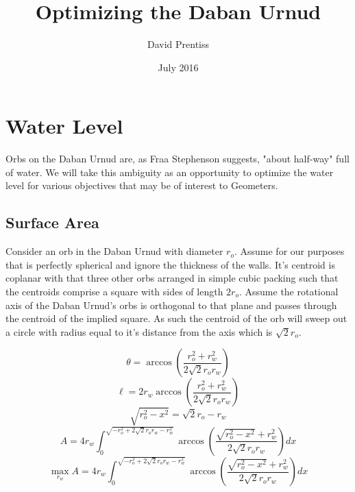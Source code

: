 \documentclass{amsart}
\title{Optimizing the Daban Urnud}
\author{David Prentiss}
\date{July 2016}
\begin{document}
\maketitle

\section{Water Level}

Orbs on the Daban Urnud are, as Fraa Stephenson suggests, "about half-way" full of water.
We will take this ambiguity as an opportunity to optimize the water level for various objectives that may be of interest to Geometers. 

\subsection{Surface Area}

Consider an orb in the Daban Urnud with diameter $r_o$.
Assume for our purposes that is perfectly spherical and ignore the thickness of the walls.
It's centroid is coplanar with that three other orbs arranged in simple cubic packing such that the centroids comprise a square with sides of length $2r_o$. 
Assume the rotational axis of the Daban Urnud's orbs is orthogonal to that plane and passes through the centroid of the implied square.
As such the centroid of the orb will sweep out a circle with radius equal to it's distance from the axis which is $\sqrt{2}r_o$.




\[
    \theta = \arccos \left(\frac{r_o^2+r_w^2}{2 \sqrt{2} r_o r_w}\right)
    \]
\[
    \ell = 2 r_w\arccos \left(\frac{r_o^2+r_w^2}{2 \sqrt{2} r_o r_w}\right)
    \]
\[
    \sqrt{r_o^2-x^2} = \sqrt{2}r_o - r_w
    \]
\[
    A = 4 r_w \int_0^{\sqrt{-r_o^2+2\sqrt{2}r_o r_w-r_w^2}} \arccos \left(\frac{\sqrt{r_o^2-x^2}+r_w^2}{2 \sqrt{2} r_o r_w}\right) dx
    \]
\[
    \max_{r_w} A = 4 r_w \int_0^{\sqrt{-r_o^2+2\sqrt{2}r_o r_w-r_w^2}} \arccos \left(\frac{\sqrt{r_o^2-x^2}+r_w^2}{2 \sqrt{2} r_o r_w}\right) dx
    \]
    
\end{document}
